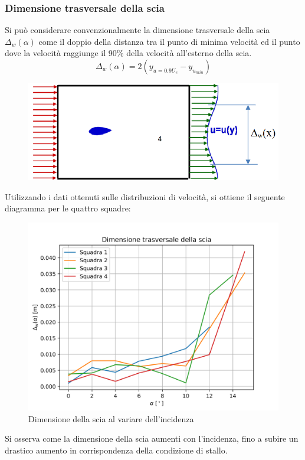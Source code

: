 \subsubsection{Dimensione trasversale della scia}
Si può considerare convenzionalmente la dimensione trasversale della scia $\Delta_w(\alpha)$ come il doppio della distanza tra il punto di minima velocità ed il punto dove la velocità raggiunge il 90\% della velocità all'esterno della scia.
\begin{equation*}
    \Delta_w(\alpha) = 2 (y_{u=0.9U_e} - y_{u_{min}})
\end{equation*}
\begin{figure}[H]
    \centering
    \includegraphics[width=.55\textwidth]{images/6/deltawimage.png}
\end{figure}

\noindent Utilizzando i dati ottenuti sulle distribuzioni di velocità, si ottiene il seguente diagramma per le quattro squadre:
\begin{figure}[H]
    \centering
    \includegraphics[width=.75\textwidth]{images/6/dim scia.png}
    \caption{Dimensione della scia al variare dell'incidenza}
\end{figure}

\noindent Si osserva come la dimensione della scia aumenti con l'incidenza, fino a subire un drastico aumento in corrispondenza della condizione di stallo.
